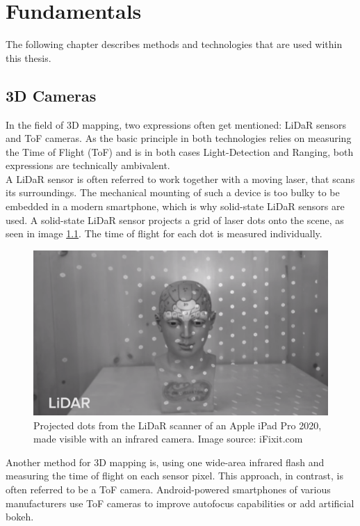 \chapter{Fundamentals}
\label{sec:Fundamentals}
The following chapter describes methods and technologies that are used within this thesis.
\section{3D Cameras}
\label{sec:ToFCamera}
In the field of 3D mapping, two expressions often get mentioned: LiDaR sensors and ToF cameras. As the basic principle in both technologies relies on measuring the Time of Flight (ToF) and is in both cases Light-Detection and Ranging, both expressions are technically ambivalent.\\
A LiDaR sensor is often referred to work together with a moving laser, that scans its surroundings.\cite{Techradar_Lidar} The mechanical mounting of such a device is too bulky to be embedded in a modern smartphone, which is why solid-state LiDaR sensors are used. A solid-state LiDaR sensor projects a grid of laser dots onto the scene, as seen in image \ref{im:iPadLidar}. The time of flight for each dot is measured individually.
\begin{figure}[H]
    \centering
    \includegraphics[width=1.0\textwidth]{images/ifixit_lidar.png}
    \caption{Projected dots from the LiDaR scanner of an Apple iPad Pro 2020, made visible with an infrared camera. Image source: iFixit.com}
    \label{im:iPadLidar}
\end{figure}
Another method for 3D mapping is, using one wide-area infrared flash and measuring the time of flight on each sensor pixel. This approach, in contrast, is often referred to be a ToF camera. Android-powered smartphones of various manufacturers use ToF cameras to improve autofocus capabilities or add artificial bokeh.\\
